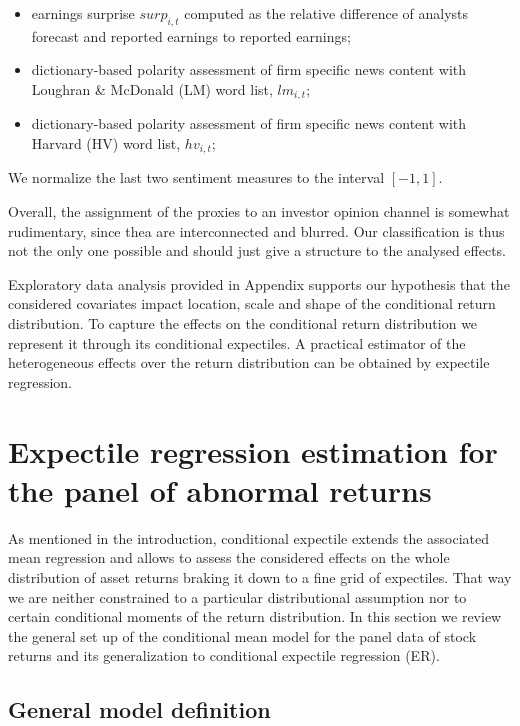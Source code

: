 \documentclass[]{article}
\providecommand{\tightlist}{%
  \setlength{\itemsep}{0pt}\setlength{\parskip}{0pt}}
\begin{document}
\begin{itemize}
\tightlist
\item
  earnings surprise \(surp_{i,t}\) computed as the relative difference of analysts forecast and reported earnings to reported earnings;
\item
  dictionary-based polarity assessment of firm specific news content with Loughran \& McDonald (LM) word list, \(lm_{i,t}\);
\item
  dictionary-based polarity assessment of firm specific news content with Harvard (HV) word list, \(hv_{i,t}\);
\end{itemize}

We normalize the last two sentiment measures to the interval \([-1,1]\).

Overall, the assignment of the proxies to an investor opinion channel is somewhat rudimentary, since thea are interconnected and blurred. Our classification is thus not the only one possible and should just give a structure to the analysed effects.

Exploratory data analysis provided in Appendix supports our hypothesis that the considered covariates impact location, scale and shape of the conditional return distribution. To capture the effects on the conditional return distribution we represent it through its conditional expectiles. A practical estimator of the heterogeneous effects over the return distribution can be obtained by expectile regression.

\hypertarget{expectile-regression-for-the-panel-data-of-nasdaq-returns}{%
\section{Expectile regression estimation for the panel of abnormal returns}\label{expectile-regression-for-the-panel-data-of-nasdaq-returns}}

As mentioned in the introduction, conditional expectile extends the associated mean regression and allows to assess the considered effects on the whole distribution of asset returns braking it down to a fine grid of expectiles. That way we are neither constrained to a particular distributional assumption nor to certain conditional moments of the return distribution. In this section we review the general set up of the conditional mean model for the panel data of stock returns and its generalization to conditional expectile regression (ER).

\hypertarget{general-model-definition}{%
\subsection{General model definition}\label{general-model-definition}}
\end{document}
